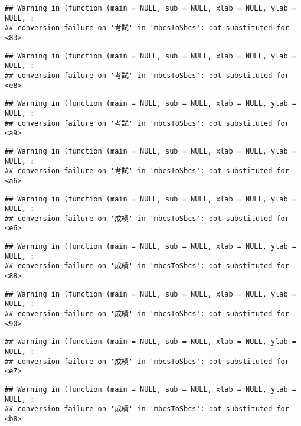 \documentclass[
]{book}
\begin{document}
\begin{verbatim}
## Warning in (function (main = NULL, sub = NULL, xlab = NULL, ylab = NULL, :
## conversion failure on '考試' in 'mbcsToSbcs': dot substituted for <83>
\end{verbatim}

\begin{verbatim}
## Warning in (function (main = NULL, sub = NULL, xlab = NULL, ylab = NULL, :
## conversion failure on '考試' in 'mbcsToSbcs': dot substituted for <e8>
\end{verbatim}

\begin{verbatim}
## Warning in (function (main = NULL, sub = NULL, xlab = NULL, ylab = NULL, :
## conversion failure on '考試' in 'mbcsToSbcs': dot substituted for <a9>
\end{verbatim}

\begin{verbatim}
## Warning in (function (main = NULL, sub = NULL, xlab = NULL, ylab = NULL, :
## conversion failure on '考試' in 'mbcsToSbcs': dot substituted for <a6>
\end{verbatim}

\begin{verbatim}
## Warning in (function (main = NULL, sub = NULL, xlab = NULL, ylab = NULL, :
## conversion failure on '成績' in 'mbcsToSbcs': dot substituted for <e6>
\end{verbatim}

\begin{verbatim}
## Warning in (function (main = NULL, sub = NULL, xlab = NULL, ylab = NULL, :
## conversion failure on '成績' in 'mbcsToSbcs': dot substituted for <88>
\end{verbatim}

\begin{verbatim}
## Warning in (function (main = NULL, sub = NULL, xlab = NULL, ylab = NULL, :
## conversion failure on '成績' in 'mbcsToSbcs': dot substituted for <90>
\end{verbatim}

\begin{verbatim}
## Warning in (function (main = NULL, sub = NULL, xlab = NULL, ylab = NULL, :
## conversion failure on '成績' in 'mbcsToSbcs': dot substituted for <e7>
\end{verbatim}

\begin{verbatim}
## Warning in (function (main = NULL, sub = NULL, xlab = NULL, ylab = NULL, :
## conversion failure on '成績' in 'mbcsToSbcs': dot substituted for <b8>
\end{verbatim}
\end{document}
